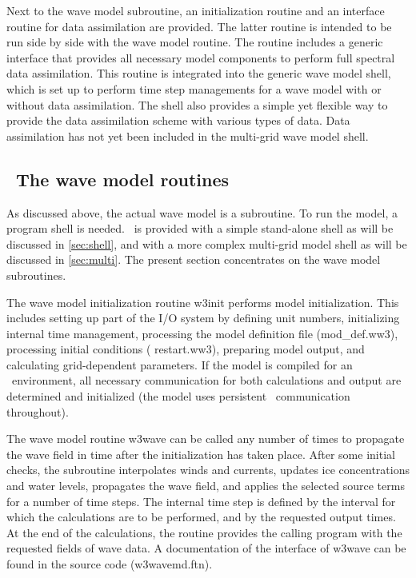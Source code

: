 Next to the wave model subroutine, an initialization routine and an interface
routine for data assimilation are provided. The latter routine is intended to
be run side by side with the wave model routine. The routine includes a
generic interface that provides all necessary model components to perform full
spectral data assimilation. This routine is integrated into the generic wave
model shell, which is set up to perform time step managements for a wave model
with or without data assimilation. The shell also provides a simple yet
flexible way to provide the data assimilation scheme with various types of
data. Data assimilation has not yet been included in the multi-grid wave model
shell.


\vssub
\subsection{~The wave model routines} \label{sec:core}
\vssub

As discussed above, the actual wave model is a subroutine. To run the model, a
program shell is needed. \ws\ is provided with a simple stand-alone shell as
will be discussed in \para\ref{sec:shell}, and with a more complex multi-grid
model shell as will be discussed in \para\ref{sec:multi}. The present section
concentrates on the wave model subroutines.

The wave model initialization routine {\F w3init} performs model
initialization. This includes setting up part of the I/O system by defining
unit numbers, initializing internal time management, processing the model
definition file ({\file mod\_def.ww3}), processing initial conditions ({\file
restart.ww3}), preparing model output, and calculating grid-dependent
parameters. If the model is compiled for an \mpi\ environment, all necessary
communication for both calculations and output are determined and initialized
(the model uses persistent \mpi\ communication throughout).

The wave model routine {\F w3wave} can be called any number of times to
propagate the wave field in time after the initialization has taken
place. After some initial checks, the subroutine interpolates winds and
currents, updates ice concentrations and water levels, propagates the wave
field, and applies the selected source terms for a number of time steps. The
internal time step is defined by the interval for which the calculations are
to be performed, and by the requested output times. At the end of the
calculations, the routine provides the calling program with the requested
fields of wave data. A documentation of the interface of {\F w3wave} can be
found in the source code ({\file w3wavemd.ftn}).

